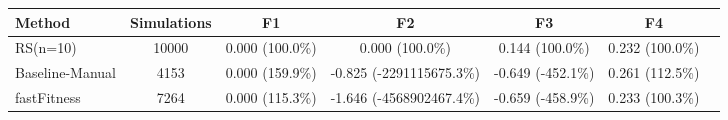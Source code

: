 \begin{tabular}{lcccccc}
\toprule
         Method &  Simulations &              F1 &                       F2 &                F3 &              F4 \\
\midrule
       RS(n=10) &        10000 & 0.000 (100.0\%) &          0.000 (100.0\%) &   0.144 (100.0\%) & 0.232 (100.0\%) \\
Baseline-Manual &         4153 & 0.000 (159.9\%) & -0.825 (-2291115675.3\%) & -0.649 (-452.1\%) & 0.261 (112.5\%) \\
    fastFitness &         7264 & 0.000 (115.3\%) & -1.646 (-4568902467.4\%) & -0.659 (-458.9\%) & 0.233 (100.3\%) \\
\bottomrule
\end{tabular}
